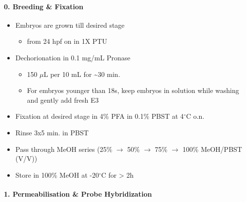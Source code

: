 \documentclass[11pt,singlespacinge,twoside]{reedthesis} %
\providecommand{\tightlist}{%
  \setlength{\itemsep}{0pt}\setlength{\parskip}{0pt}}
\begin{document}
\hypertarget{breeding-fixation}{%
\paragraph{0. Breeding \& Fixation}\label{breeding-fixation}}
\begin{itemize}
\tightlist
\item
  Embryos are grown till desired stage
  \begin{itemize}
  \tightlist
  \item
    from 24 hpf on in 1X PTU
  \end{itemize}
\item
  Dechorionation in 0.1 mg/mL Pronase
  \begin{itemize}
  \tightlist
  \item
    150 \(\mu\)L per 10 mL for \textasciitilde{}30 min.
  \item
    For embryos younger than 18s, keep embryos in solution while washing and gently add fresh E3
  \end{itemize}
\item
  Fixation at desired stage in 4\% PFA in 0.1\% PBST at 4\(^\circ\)C o.n.
\item
  Rinse 3x5 min. in PBST
\item
  Pass through MeOH series (25\% \(\rightarrow\) 50\% \(\rightarrow\) 75\% \(\rightarrow\) 100\% MeOH/PBST (V/V))
\item
  Store in 100\% MeOH at -20\(^\circ\)C for \textgreater{} 2h
\end{itemize}
\hypertarget{permeabilisation-probe-hybridization}{%
\paragraph{\texorpdfstring{1. Permeabilisation \& Probe Hybridization \newline \newline}{1. Permeabilisation \& Probe Hybridization }}\label{permeabilisation-probe-hybridization}}
\end{document}
